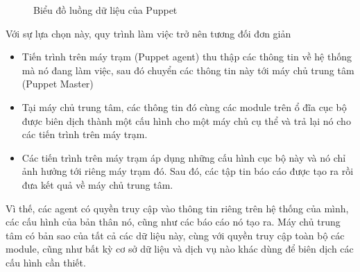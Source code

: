 \begin{figure}[h!]
    \begin{center}
    \end{center}
    \caption{Biểu đồ luồng dữ liệu của Puppet}
    \label{fig:puppet_dataflow}
\end{figure}

Với sự lựa chọn này, quy trình làm việc trở nên tương đối đơn giản

\begin{itemize}
\item Tiến trình trên máy trạm (Puppet agent) thu thập các thông tin về hệ thống mà nó đang làm việc, sau đó chuyển các thông tin này tới máy chủ trung tâm (Puppet Master)

\item Tại máy chủ trung tâm, các thông tin đó cùng các module trên ổ đĩa cục bộ được biên dịch thành một cấu hình cho một máy chủ cụ thể và trả lại nó cho các tiến trình trên máy trạm.

\item Các tiến trình trên máy trạm áp dụng những cấu hình cục bộ này và nó chỉ ảnh hưởng tới riêng máy trạm đó. Sau đó, các tập tin báo cáo được tạo ra rồi đưa kết quả về máy chủ trung tâm.
\end{itemize}

Vì thế, các agent có quyền truy cập vào thông tin riêng trên hệ thống của mình, các cấu hình của bản thân nó, cũng như các báo cáo nó tạo ra. Máy chủ trung tâm có bản sao của tất cả các dữ liệu này, cùng với quyền truy cập toàn bộ các module, cũng như bất kỳ cơ sở dữ liệu và dịch vụ nào khác dùng để biên dịch các cấu hình cần thiết.

